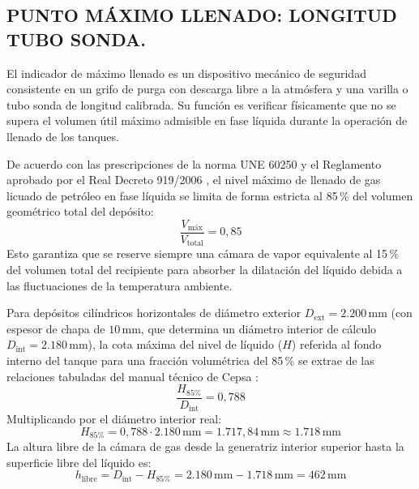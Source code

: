 \documentclass[12pt]{article}
\begin{document}
        \subsection{PUNTO MÁXIMO LLENADO: LONGITUD TUBO SONDA.}
        El indicador de máximo llenado es un dispositivo mecánico de seguridad consistente en un grifo de purga con descarga libre a la atmósfera y una varilla o tubo sonda de longitud calibrada. Su función es verificar físicamente que no se supera el volumen útil máximo admisible en fase líquida durante la operación de llenado de los tanques.

        De acuerdo con las prescripciones de la norma UNE 60250 \cite{une60250} y el Reglamento aprobado por el Real Decreto 919/2006 \cite{rd919}, el nivel máximo de llenado de gas licuado de petróleo en fase líquida se limita de forma estricta al 85\,\% del volumen geométrico total del depósito:
        \begin{equation}
            \frac{V_{\text{máx}}}{V_{\text{total}}} = 0,85
        \end{equation}
        Esto garantiza que se reserve siempre una cámara de vapor equivalente al 15\,\% del volumen total del recipiente para absorber la dilatación del líquido debida a las fluctuaciones de la temperatura ambiente.

        Para depósitos cilíndricos horizontales de diámetro exterior $D_{\text{ext}} = 2.200\,\text{mm}$ (con espesor de chapa de $10\,\text{mm}$, que determina un diámetro interior de cálculo $D_{\text{int}} = 2.180\,\text{mm}$), la cota máxima del nivel de líquido ($H$) referida al fondo interno del tanque para una fracción volumétrica del 85\,\% se extrae de las relaciones tabuladas del manual técnico de Cepsa \cite{cepsamanual}:
        \begin{equation}
            \frac{H_{85\%}}{D_{\text{int}}} = 0,788
        \end{equation}
        Multiplicando por el diámetro interior real:
        \begin{equation}
            H_{85\%} = 0,788 \cdot 2.180\,\text{mm} = 1.717,84\,\text{mm} \approx 1.718\,\text{mm}
        \end{equation}
        La altura libre de la cámara de gas desde la generatriz interior superior hasta la superficie libre del líquido es:
        \begin{equation}
            h_{\text{libre}} = D_{\text{int}} - H_{85\%} = 2.180\,\text{mm} - 1.718\,\text{mm} = 462\,\text{mm}
        \end{equation}
\end{document}
